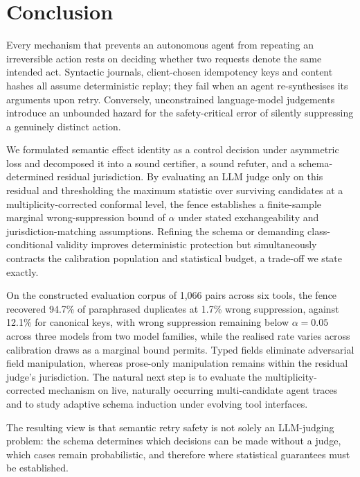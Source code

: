 \section{Conclusion}\label{sec:conclusion}

Every mechanism that prevents an autonomous agent from repeating an irreversible action rests on deciding whether two requests denote the same intended act. Syntactic journals, client-chosen idempotency keys and content hashes all assume deterministic replay; they fail when an agent re-synthesises its arguments upon retry. Conversely, unconstrained language-model judgements introduce an unbounded hazard for the safety-critical error of silently suppressing a genuinely distinct action.

We formulated semantic effect identity as a control decision under asymmetric loss and decomposed it into a sound certifier, a sound refuter, and a schema-determined residual jurisdiction. By evaluating an LLM judge only on this residual and thresholding the maximum statistic over surviving candidates at a multiplicity-corrected conformal level, the fence establishes a finite-sample marginal wrong-suppression bound of $\alpha$ under stated exchangeability and jurisdiction-matching assumptions. Refining the schema or demanding class-conditional validity improves deterministic protection but simultaneously contracts the calibration population and statistical budget, a trade-off we state exactly.

On the constructed evaluation corpus of 1,066 pairs across six tools, the fence recovered 94.7\% of paraphrased duplicates at 1.7\% wrong suppression, against 12.1\% for canonical keys, with wrong suppression remaining below $\alpha=0.05$ across three models from two model families, while the realised rate varies across calibration draws as a marginal bound permits. Typed fields eliminate adversarial field manipulation, whereas prose-only manipulation remains within the residual judge's jurisdiction. The natural next step is to evaluate the multiplicity-corrected mechanism on live, naturally occurring multi-candidate agent traces and to study adaptive schema induction under evolving tool interfaces.

The resulting view is that semantic retry safety is not solely an LLM-judging problem: the schema determines which decisions can be made without a judge, which cases remain probabilistic, and therefore where statistical guarantees must be established.
